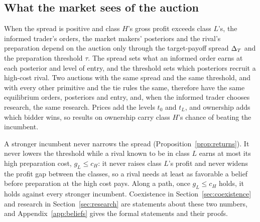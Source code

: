 \subsection{What the market sees of the auction}\label{sec:twonumbers}

When the spread is positive and class \(H\)'s gross profit exceeds class \(L\)'s, the informed trader's orders, the market
makers' posteriors and the rival's preparation depend on the auction only through the target-payoff spread
\(\Delta_T\) and the preparation threshold \(\tau\). The spread sets what an informed order earns at each posterior and
level of entry, and the threshold sets which posteriors recruit a high-cost rival. Two auctions with the same
spread and the same threshold, and with every other primitive and the tie rules the same, therefore have the same
equilibrium orders, posteriors and entry, and, when the informed trader chooses research, the same research. Prices add the
levels \(t_0\) and \(t_L\), and ownership adds which bidder wins, so results on ownership carry class \(H\)'s chance
of beating the incumbent.

A stronger incumbent never narrows the spread (Proposition~\ref{prop:returns}). It never lowers the threshold while a
rival known to be in class \(L\) earns at most its high preparation cost, \(g_L\le c_H\): it never raises class
\(L\)'s profit and never widens the profit gap between the classes, so a rival needs at least as favorable a
belief before preparation at the high cost pays. Along a path, once \(g_L\le c_H\) holds, it holds against every
stronger incumbent. Coexistence in Section~\ref{sec:coexistence} and research in Section~\ref{sec:research} are
statements about these two numbers, and Appendix~\ref{app:beliefs} gives the formal statements and their proofs.
